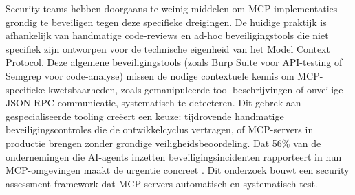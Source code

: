 Security-teams hebben doorgaans te weinig middelen om MCP-implementaties grondig te beveiligen tegen deze specifieke dreigingen. De huidige praktijk is afhankelijk van handmatige code-reviews en ad-hoc beveiligingstools die niet specifiek zijn ontworpen voor de technische eigenheid van het Model Context Protocol. Deze algemene beveiligingstools (zoals Burp Suite voor API-testing of Semgrep voor code-analyse) missen de nodige contextuele kennis om MCP-specifieke kwetsbaarheden, zoals gemanipuleerde tool-\hspace{0pt}beschrijvingen of onveilige JSON-RPC-communicatie, systematisch te detecteren. Dit gebrek aan gespecialiseerde tooling creëert een keuze: tijdrovende handmatige beveiligingscontroles die de ontwikkelcyclus vertragen, of MCP-servers in productie brengen zonder grondige veiligheidsbeoordeling. Dat 56\% van de ondernemingen die AI-agents inzetten beveiligingsincidenten rapporteert in hun MCP-omgevingen maakt de urgentie concreet \autocite{guo2025systematicanalysismcpsecurity}. Dit onderzoek bouwt een security assessment framework dat MCP-servers automatisch en systematisch test.




\section{}%
\label{sec:probleemstelling}

